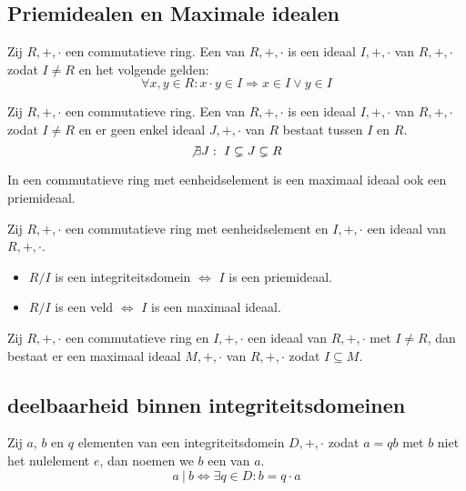 \documentclass[main.tex]{subfiles}
\begin{document}
\subsection{Priemidealen en Maximale idealen}
\label{sec:priem-en-maxim}

\begin{de}
  Zij $R,+,\cdot$ een commutatieve ring.
  Een  van $R,+,\cdot$ is een ideaal $I,+,\cdot$ van $R,+,\cdot$ zodat $I\neq R$ en het volgende gelden:
  \[ \forall x,y \in R: x \cdot y \in I \Rightarrow x \in I \vee y \in I \]
\end{de}

\begin{de}
  Zij $R,+,\cdot$ een commutatieve ring.
  Een  van $R,+,\cdot$ is een ideaal $I,+,\cdot$ van $R,+,\cdot$ zodat $I\neq R$ en er geen enkel ideaal $J,+,\cdot$ van $R$ bestaat tussen $I$ en $R$.
  \[ \not\exists J:\ I \subsetneq J \subsetneq R \]
\end{de}

\begin{ei}
  In een commutatieve ring met eenheidselement is een maximaal ideaal ook een priemideaal.
\end{ei}

\begin{st}
  Zij $R,+,\cdot$ een commutatieve ring met eenheidselement en $I,+,\cdot$ een ideaal van $R,+,\cdot$.
  \begin{itemize}
  \item $R/I$ is een integriteitsdomein $\Leftrightarrow$ $I$ is een priemideaal.
  \item $R/I$ is een veld $\Leftrightarrow$ $I$ is een maximaal ideaal.
  \end{itemize}
\end{st}

\begin{st}
  Zij $R,+,\cdot$ een commutatieve ring en $I,+,\cdot$ een ideaal van $R,+,\cdot$ met $I\neq R$, dan bestaat er een maximaal ideaal $M,+,\cdot$ van $R,+,\cdot$ zodat $I \subseteq M$.
  \zb
\end{st}

\subsection{deelbaarheid binnen integriteitsdomeinen}
\label{sec:deelbaarheid-binnen-integriteitsdomeinen}

\begin{de}
  Zij $a$, $b$ en $q$ elementen van een integriteitsdomein $D,+,\cdot$ zodat $a= qb$ met $b$ niet het nulelement $e$, dan noemen we $b$ een  van $a$.
  \[ a\ |\ b \Leftrightarrow \exists q \in D: b = q\cdot a \]
\end{de}
\end{document}
